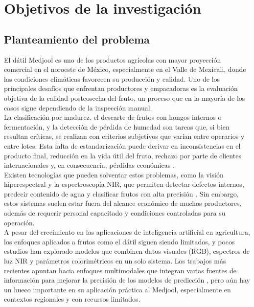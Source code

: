 
\chapter{Objetivos de la investigación}

\label{Chapter2}


\section{Planteamiento del problema}

El dátil Medjool es uno de los productos agrícolas con mayor proyección comercial en el noroeste de México, especialmente en el Valle de Mexicali, donde las condiciones climáticas favorecen su producción y calidad. Uno de los principales desafíos que enfrentan productores y empacadoras es la evaluación objetiva de la calidad postcosecha del fruto, un proceso que en la mayoría de los casos sigue dependiendo de la inspección manual.\\

La clasificación por madurez, el descarte de frutos con hongos internos o fermentación, y la detección de pérdida de humedad son tareas que, si bien resultan críticas, se realizan con criterios subjetivos que varían entre operarios y entre lotes. Esta falta de estandarización puede derivar en inconsistencias en el producto final, reducción en la vida útil del fruto, rechazo por parte de clientes internacionales y, en consecuencia, pérdidas económicas \parencite{perez-perez_evaluation_2021}.\\

Existen tecnologías que pueden solventar estos problemas, como la visión hiperespectral y la espectroscopía NIR, que permiten detectar defectos internos, predecir contenido de agua y clasificar frutos con alta precisión \parencite{ulu_comparison_2025, yuan_determination_2025}. Sin embargo, estos sistemas suelen estar fuera del alcance económico de muchos productores, además de requerir personal capacitado y condiciones controladas para su operación.\\

A pesar del crecimiento en las aplicaciones de inteligencia artificial en agricultura, los enfoques aplicados a frutos como el dátil siguen siendo limitados, y pocos estudios han explorado modelos que combinen datos visuales (RGB), espectros de luz NIR y parámetros colorimétricos en un solo sistema. Los trabajos más recientes apuntan hacia enfoques multimodales que integran varias fuentes de información para mejorar la precisión de los modelos de predicción \parencite{gupta_fruveg-net_2024, apostolopoulos_general_2023}, pero aún hay un hueco importante en su aplicación práctica al Medjool, especialmente en contextos regionales y con recursos limitados.\\

